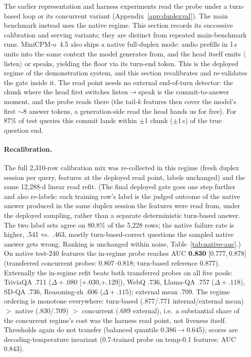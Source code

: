 The earlier representation and harness experiments read the probe
under a turn-based loop or its concurrent variant
(Appendix~\ref{app:duplexval}). The main benchmark instead uses the
native regime. This section records its successive calibration and
serving variants; they are distinct from repeated main-benchmark runs. MiniCPM-o~4.5 also
ships a native full-duplex mode: audio prefills in 1\,s units into the
same context the model generates from, and the head itself emits
$\langle$listen$\rangle$ or speaks, yielding the floor via its
turn-end token. This is the deployed regime of the demonstration
system, and this section recalibrates and re-validates the gate inside
it. The read point needs no external end-of-turn detector: the chunk
where the head first switches listen$\to$speak is the
commit-to-answer moment, and the probe reads there (the tail-$k$
features then cover the model's first $\sim$8 answer tokens, a
generation-side read the head hands us for free). For 87\% of test
queries this commit lands within $\pm$1 chunk ($\pm$1\,s) of the true
question end.

\paragraph{Recalibration.} The full 2{,}310-row calibration mix was
re-collected in this regime (fresh duplex session per query, features
at the deployed read point, labels unchanged) and the same 12{,}288-d
linear read refit. (The final deployed gate goes one step further and
also re-labels: each training row's label is the judged outcome of
the native answer produced in the same duplex session the features
were read from, under the deployed sampling, rather than a separate
deterministic turn-based answer. The two label sets agree on 80.8\%
of the 5{,}228 rows; the native failure rate is higher, .541
vs.\ .463, mostly turn-based-correct questions the sampled native
answer gets wrong. Ranking is unchanged within noise,
Table~\ref{tab:native-auc}.) On native test-240 features the in-regime probe
reaches AUC \textbf{0.830} [0.777,\,0.878] (transferred concurrent
probes: 0.807--0.818; turn-based reference 0.877). Externally the
in-regime refit beats both transferred probes on all five pools:
TriviaQA .711 ($\Delta{+}.080$ [+.030,+.129]), WebQ .736, Llama-QA
.757 ($\Delta{+}.118$), SD-QA .736, Reasoning-zh .606
($\Delta{+}.115$); external mean .709. The regime ordering is
monotone everywhere: turn-based (.877/.771 internal/external mean)
$>$ native (.830/.709) $>$ concurrent (.689 external), i.e.\ a
substantial share of the concurrent regime's cost was the harness
read point, not liveness itself. Thresholds again do not
transfer (balanced quantile 0.386$\to$0.645); scores are
decoding-temperature invariant (0.7-trained probe on temp-0.1
features: AUC 0.843).

